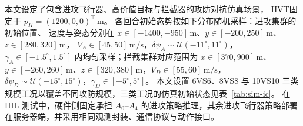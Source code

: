 本文设定了包含进攻飞行器、高价值目标与拦截器的攻防对抗仿真场景，
HVT固定于 $p_H=(1200,0,0)^\top\,\mathrm{m}$。
各回合初始态势按如下分布随机采样：进攻集群的初始位置、
速度与姿态分别在 $x\in[-1400,-950]\,\mathrm{m}$、$y\in[-200,250]\,\mathrm{m}$、$z\in[280,320]\,\mathrm{m}$，
$V_A\in[45,50]\,\mathrm{m/s}$，$\delta\psi_A\sim\mathcal{U}(-11^\circ,11^\circ)$，
$\gamma_A\in[-1.5^\circ,1.5^\circ]$ 内均匀采样；拦截集群对应范围为 $x\in[370,900]\,
\mathrm{m}$、$y\in[-260,260]\,\mathrm{m}$、$z\in[320,380]\,\mathrm{m}$，$V_D\in[55,60]\,
\mathrm{m/s}$，$\delta\psi_D\sim\mathcal{U}(-15^\circ,15^\circ)$，$\gamma_D\in[-5^\circ,5^\circ]$。
本文设置 6VS6、8VS8 与 10VS10 三类规模工况以覆盖不同攻防规模，三类工况的仿真初始状态见表~\ref{tab:sim-ic}。
在 HIL 测试中，硬件侧固定承担 $A_0$--$A_4$ 的进攻策略推理，其余进攻飞行器策略部署在服务器端，并采用相同观测封装、通信协议与动作接口。





